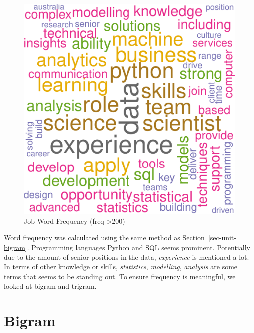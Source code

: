 \documentclass[
  letterpaper,
]{report}
\begin{document}
\begin{figure}

{\centering \includegraphics{./03_3-jobtext_files/figure-pdf/fig-job-freqency-1.pdf}

}

\caption{\label{fig-job-freqency}Job Word Frequency (freq
\textgreater200)}

\end{figure}

Word frequency was calculated using the same method as
Section~\ref{sec-unit-bigram}. Programming languages Python and SQL
seems prominent. Potentially due to the amount of senior positions in
the data, \emph{experience} is mentioned a lot. In terms of other
knowledge or skills, \emph{statistics}, \emph{modelling},
\emph{analysis} are some terms that seems to be standing out. To ensure
frequency is meaningful, we looked at bigram and trigram.

\hypertarget{bigram}{%
\section{Bigram}\label{bigram}}
\end{document}
